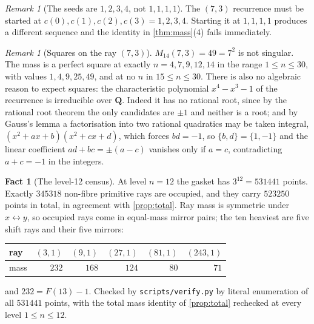 \documentclass[11pt]{amsart}
\theoremstyle{definition}
\newtheorem{fact}[theorem]{Fact}
\theoremstyle{remark}
\newtheorem{remark}[theorem]{Remark}
\begin{document}
\begin{remark}[The seeds are $1,2,3,4$, not $1,1,1,1$]
\label{rem:seeds}
The $(7,3)$ recurrence must be started at $c(0),c(1),c(2),c(3)=1,2,3,4$. Starting it at $1,1,1,1$ produces a different sequence and the identity in \cref{thm:mass}(4) fails immediately.
\end{remark}

\begin{remark}[Squares on the ray $(7,3)$]
\label{rem:squares}
$M_{14}(7,3)=49=7^2$ is not singular. The mass is a perfect square at exactly $n=4,7,9,12,14$ in the range $1\le n\le 30$, with values $1,4,9,25,49$, and at no $n$ in $15\le n\le 30$. There is also no algebraic reason to expect squares: the characteristic polynomial $x^4-x^3-1$ of the recurrence is irreducible over $\mathbf{Q}$. Indeed it has no rational root, since by the rational root theorem the only candidates are $\pm 1$ and neither is a root; and by Gauss's lemma a factorisation into two rational quadratics may be taken integral, $(x^2+ax+b)(x^2+cx+d)$, which forces $bd=-1$, so $\{b,d\}=\{1,-1\}$ and the linear coefficient $ad+bc=\pm(a-c)$ vanishes only if $a=c$, contradicting $a+c=-1$ in the integers.
\end{remark}

\begin{fact}[The level-12 census]
\label{fact:census12}
At level $n=12$ the gasket has $3^{12}=531441$ points. Exactly $345318$ non-fibre primitive rays are occupied, and they carry $523250$ points in total, in agreement with \cref{prop:total}. Ray mass is symmetric under $x\leftrightarrow y$, so occupied rays come in equal-mass mirror pairs; the ten heaviest are five shift rays and their five mirrors:
\begin{center}
\begin{tabular}{lrrrrr}
\toprule
ray & $(3,1)$ & $(9,1)$ & $(27,1)$ & $(81,1)$ & $(243,1)$ \\
\midrule
mass & $232$ & $168$ & $124$ & $80$ & $71$ \\
\bottomrule
\end{tabular}
\end{center}
and $232=F(13)-1$. Checked by \texttt{scripts/verify.py} by literal enumeration of all $531441$ points, with the total mass identity of \cref{prop:total} rechecked at every level $1\le n\le 12$.
\end{fact}
\end{document}
